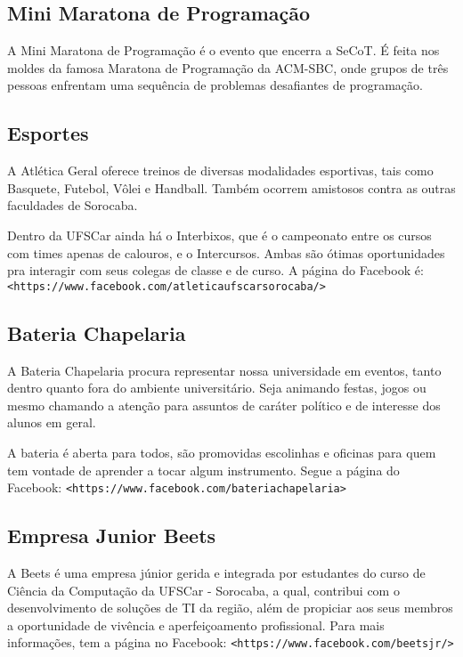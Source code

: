 \subsection{Mini Maratona de Programação}
A Mini Maratona de Programação é o evento que encerra a SeCoT. É feita nos moldes da famosa Maratona de Programação da ACM-SBC, onde grupos de três pessoas enfrentam uma sequência de problemas desafiantes de programação.

\subsection{Esportes}
A Atlética Geral oferece treinos de diversas modalidades esportivas, tais como Basquete, Futebol, Vôlei e Handball. Também ocorrem amistosos contra as outras faculdades de Sorocaba.

Dentro da UFSCar ainda há o Interbixos, que é o campeonato entre os cursos com times apenas de calouros, e o Intercursos. Ambas são ótimas oportunidades pra interagir com seus colegas de classe e de curso. A página do Facebook é: \texttt{<https://www.facebook.com/atleticaufscarsorocaba/>}

\subsection{Bateria Chapelaria}
A Bateria Chapelaria procura representar nossa universidade em eventos, tanto dentro quanto fora do ambiente universitário. Seja animando festas, jogos ou mesmo chamando a atenção para assuntos de caráter político e de interesse dos alunos em geral.

A bateria é aberta para todos, são promovidas escolinhas e oficinas para quem tem vontade de aprender a tocar algum instrumento. Segue a página do Facebook: \newline \texttt{<https://www.facebook.com/bateriachapelaria>}

\subsection{Empresa Junior Beets}
A Beets é uma empresa júnior gerida e integrada por estudantes do curso de Ciência da Computação da UFSCar - Sorocaba, a qual, contribui com o desenvolvimento de soluções de TI da região, além de propiciar aos seus membros a oportunidade de vivência e aperfeiçoamento profissional. Para mais informações, tem a página no Facebook: \newline \texttt{<https://www.facebook.com/beetsjr/>}

